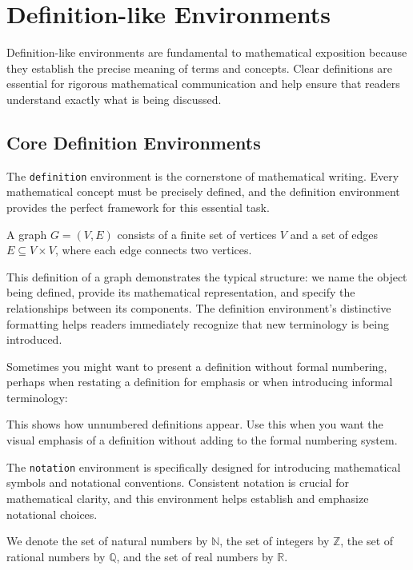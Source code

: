 \documentclass[9pt]{amsart}
\begin{document}
\section{Definition-like Environments}

Definition-like environments are fundamental to mathematical exposition because
they establish the precise meaning of terms and concepts. Clear definitions are
essential for rigorous mathematical communication and help ensure that readers
understand exactly what is being discussed.

\subsection{Core Definition Environments}

The \texttt{definition} environment is the cornerstone of mathematical writing.
Every mathematical concept must be precisely defined, and the definition
environment provides the perfect framework for this essential task.

\begin{definition}[Graph]
    A graph $G = (V, E)$ consists of a finite set of vertices $V$ and a set of edges $E \subseteq V \times V$, where each edge connects two vertices.
\end{definition}

This definition of a graph demonstrates the typical structure: we name the
object being defined, provide its mathematical representation, and specify the
relationships between its components. The definition environment's distinctive
formatting helps readers immediately recognize that new terminology is being
introduced.

Sometimes you might want to present a definition without formal numbering,
perhaps when restating a definition for emphasis or when introducing informal
terminology:

\begin{definition*}
    This shows how unnumbered definitions appear. Use this when you want the visual emphasis of a definition without adding to the formal numbering system.
\end{definition*}

The \texttt{notation} environment is specifically designed for introducing
mathematical symbols and notational conventions. Consistent notation is crucial
for mathematical clarity, and this environment helps establish and emphasize
notational choices.

\begin{notation}
    We denote the set of natural numbers by $\mathbb{N}$, the set of integers by $\mathbb{Z}$, the set of rational numbers by $\mathbb{Q}$, and the set of real numbers by $\mathbb{R}$.
\end{notation}
\end{document}

